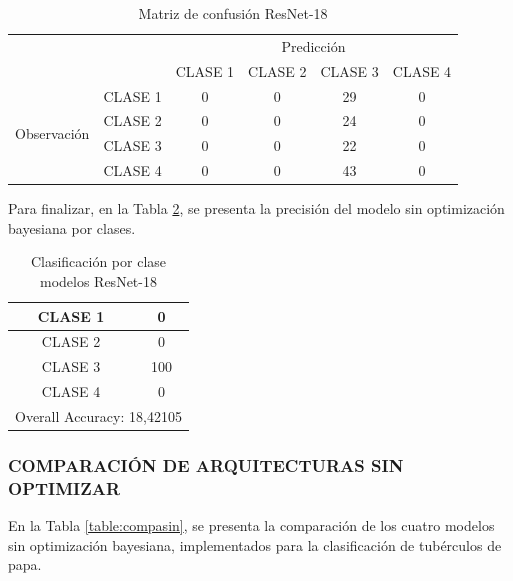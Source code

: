 \begin{table}[htbp]
	\centering
	\begin{tabular}{|c|l|c|c|c|c|}
		\hline
		\multicolumn{2}{|c|}{\multirow{2}[4]{*}{}} & \multicolumn{4}{c|}{Predicción} \bigstrut\\
		\cline{3-6}    \multicolumn{2}{|c|}{} & CLASE 1 & CLASE 2 & CLASE 3 & CLASE 4 \bigstrut\\
		\hline
		\multirow{4}[8]{*}{\begin{sideways}Observación\end{sideways}} & CLASE 1 & 0     & 0     & 29    & 0 \bigstrut\\
		\cline{2-6}          & CLASE 2 & 0     & 0     & 24    & 0 \bigstrut\\
		\cline{2-6}          & CLASE 3 & 0     & 0     & 22    & 0 \bigstrut\\
		\cline{2-6}          & CLASE 4 & 0     & 0     & 43    & 0 \bigstrut\\
		\hline
	\end{tabular}%
	\caption{Matriz de confusión ResNet-18}
	\label{MC_RESNET18}
\end{table}%

Para finalizar, en la Tabla \ref*{clase_RESNET18}, se presenta la precisión del modelo sin optimización bayesiana por clases.

\begin{table}[htbp]
	\centering
	\begin{tabular}{|c|c|}
		\hline
		CLASE 1 & 0 \bigstrut\\
		\hline
		CLASE 2 & 0 \bigstrut\\
		\hline
		CLASE 3 & 100 \bigstrut\\
		\hline
		CLASE 4 & 0 \bigstrut\\
		\hline
		\multicolumn{2}{|c|}{Overall Accuracy: 18,42105} \bigstrut\\
		\hline
	\end{tabular}%
	\caption{Clasificación por clase modelos ResNet-18}
	\label{clase_RESNET18}
\end{table}%


\newpage	
\subsubsection{\MakeUppercase{Comparación de arquitecturas sin optimizar}}
En la Tabla \ref{table:compasin}, se presenta la comparación de los cuatro modelos sin optimización bayesiana, implementados para la clasificación de tubérculos de papa.

